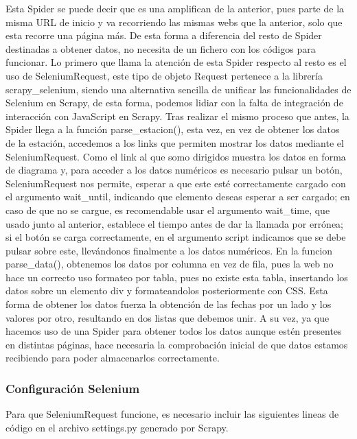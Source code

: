 Esta Spider se puede decir que es una amplifican de la anterior, pues parte de la misma URL de inicio y va recorriendo las mismas webs que la anterior, solo que esta recorre una página más. De esta forma a diferencia del resto de Spider destinadas a obtener datos, no necesita de un fichero con los códigos para funcionar.\newline
\newline
Lo primero que llama la atención de esta Spider respecto al resto es el uso de SeleniumRequest, este tipo de objeto Request pertenece a la librería scrapy\_selenium, siendo una alternativa sencilla de unificar las funcionalidades de Selenium en Scrapy, de esta forma, podemos lidiar con la falta de integración de interacción con JavaScript en Scrapy.\newline
\newline
Tras realizar el mismo proceso que antes, la Spider llega a la función parse\_estacion(), esta vez, en vez de obtener los datos de la estación, accedemos a los links que permiten mostrar los datos mediante el SeleniumRequest. Como el link al que somo dirigidos muestra los datos en forma de diagrama y, para acceder a los datos numéricos es necesario pulsar un botón, SeleniumRequest nos permite, esperar a que este esté correctamente cargado con el argumento wait\_until, indicando que elemento deseas esperar a ser cargado; en caso de que no se cargue, es recomendable usar el argumento wait\_time, que usado junto al anterior, establece el tiempo antes de dar la llamada por errónea; si el botón se carga correctamente, en el argumento script indicamos que se debe pulsar sobre este, llevándonos finalmente a los datos numéricos.\newline
\newline
En la funcion parse\_data(), obtenemos los datos por columna en vez de fila, pues la web no hace un correcto uso formateo por tabla, pues no existe esta tabla, insertando los datos sobre un elemento div y formateandolos posteriormente con CSS. Esta forma de obtener los datos fuerza la obtención de las fechas por un lado y los valores por otro, resultando en dos listas que debemos unir. A su vez, ya que hacemos uso de una Spider para obtener todos los datos aunque estén presentes en distintas páginas, hace necesaria la comprobación inicial de que datos estamos recibiendo para poder almacenarlos correctamente.

\subsubsection{Configuración Selenium}
Para que SeleniumRequest funcione, es necesario incluir las siguientes lineas de código en el archivo settings.py generado por Scrapy.

